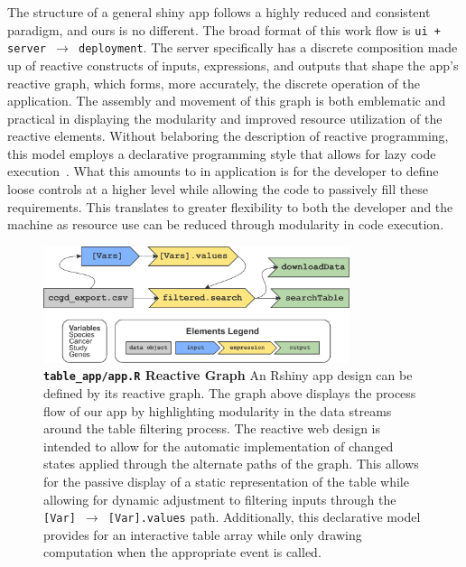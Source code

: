 \documentclass[10pt]{report}
\begin{document}
The structure of a general shiny app follows a highly reduced and consistent paradigm, and ours is no different. The broad format of this work flow is \texttt{ui + server $\rightarrow$ deployment}. The server specifically has a discrete composition made up of reactive constructs of inputs, expressions, and outputs that shape the app's reactive graph, which forms, more accurately, the discrete operation of the application. The assembly and movement of this graph is both emblematic and practical in displaying the modularity and improved resource utilization of the reactive elements. Without belaboring the description of reactive programming, this model employs a declarative programming style that allows for lazy code execution~\cite{wickhamMasteringShinyBook}. What this amounts to in application is for the developer to define loose controls at a higher level while allowing the code to passively fill these requirements. This translates to greater flexibility to both the developer and the machine as resource use can be reduced through modularity in code execution.

\begin{figure}[H]
    \center{}
    \includegraphics[width=0.8\textwidth]{fig/reactive_graph.pdf}
    \caption[\texttt{table\_app/app.R} Reactive Graph]{\textbf{\texttt{table\_app/app.R} Reactive Graph} An Rshiny app design can be defined by its reactive graph. The graph above displays the process flow of our app by highlighting modularity in the data streams around the table filtering process. The reactive web design is intended to allow for the automatic implementation of changed states applied through the alternate paths of the graph. This allows for the passive display of a static representation of the table while allowing for dynamic adjustment to filtering inputs through the \texttt{[Var] $\rightarrow$ [Var].values} path. Additionally, this declarative model provides for an interactive table array while only drawing computation when the appropriate event is called.}\label{fig:reactiveGraph}
\end{figure}
\end{document}
